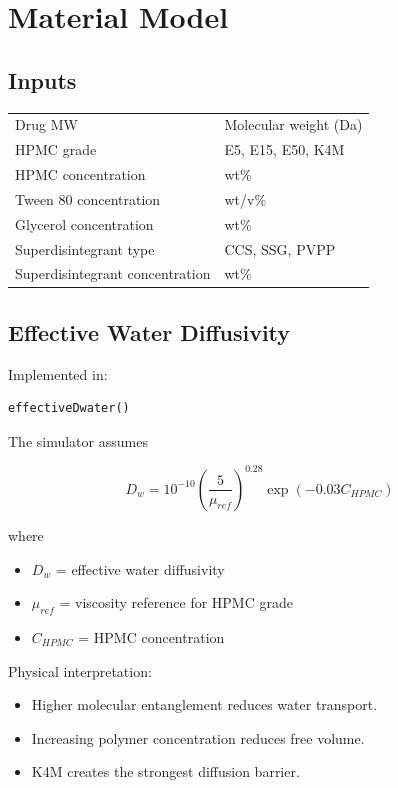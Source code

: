 \documentclass[11pt]{article}
\begin{document}
\section{Material Model}

\subsection{Inputs}

\begin{longtable}{ll}
Drug MW & Molecular weight (Da)\\
HPMC grade & E5, E15, E50, K4M\\
HPMC concentration & wt\%\\
Tween 80 concentration & wt/v\%\\
Glycerol concentration & wt\%\\
Superdisintegrant type & CCS, SSG, PVPP\\
Superdisintegrant concentration & wt\%\\
\end{longtable}

\subsection{Effective Water Diffusivity}

Implemented in:

\begin{verbatim}
effectiveDwater()
\end{verbatim}

The simulator assumes

\begin{equation}
D_w
=10^{-10}
\left(\frac{5}{\mu_{ref}}\right)^{0.28}
\exp(-0.03C_{HPMC})
\end{equation}

where

\begin{itemize}
\item $D_w$ = effective water diffusivity
\item $\mu_{ref}$ = viscosity reference for HPMC grade
\item $C_{HPMC}$ = HPMC concentration
\end{itemize}

Physical interpretation:

\begin{itemize}
\item Higher molecular entanglement reduces water transport.
\item Increasing polymer concentration reduces free volume.
\item K4M creates the strongest diffusion barrier.
\end{itemize}
\end{document}

